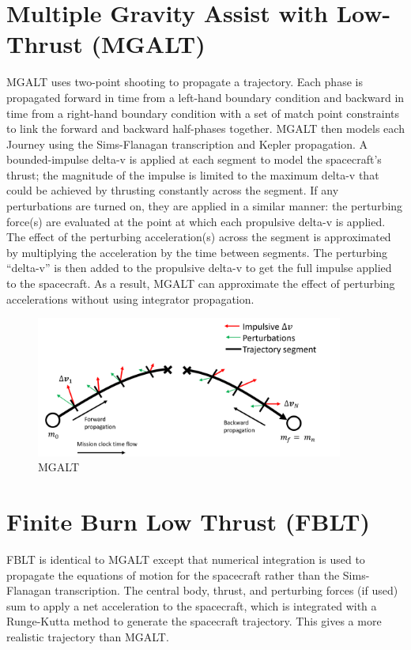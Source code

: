 \section{Multiple Gravity Assist with Low-Thrust (MGALT)}
\label{sec:MGALT}

    \acf{MGALT} uses two-point shooting to propagate a trajectory. Each phase is propagated forward in time from a left-hand boundary condition and backward in time from a right-hand boundary condition with a set of match point constraints to link the forward and backward half-phases together. \ac{MGALT} then models each Journey using the Sims-Flanagan transcription and Kepler propagation. A bounded-impulse delta-v is applied at each segment to model the spacecraft's thrust; the magnitude of the impulse is limited to the maximum delta-v that could be achieved by thrusting constantly across the segment. If any perturbations are turned on, they are applied in a similar manner: the perturbing force(s) are evaluated at the point at which each propulsive delta-v is applied. The effect of the perturbing acceleration(s) across the segment is approximated by multiplying the acceleration by the time between segments. The perturbing ``delta-v'' is then added to the propulsive delta-v to get the full impulse applied to the spacecraft. As a result, \ac{MGALT} can approximate the effect of perturbing accelerations without using integrator propagation. 

    \begin{figure}[H]
        \centering
        \includegraphics[width=0.9\textwidth]{../../shared_latex_inputs/images/mgalt.png}
        \caption{\acf{MGALT}}
    \end{figure}

\section{Finite Burn Low Thrust (FBLT)}
\label{sec:FBLT}

    \acf{FBLT} is identical to \ac{MGALT} except that numerical integration is used to propagate the equations of motion for the spacecraft rather than the Sims-Flanagan transcription. The central body, thrust, and perturbing forces (if used) sum to apply a net acceleration to the spacecraft, which is integrated with a Runge-Kutta method to generate the spacecraft trajectory. This gives a more realistic trajectory than \ac{MGALT}.

